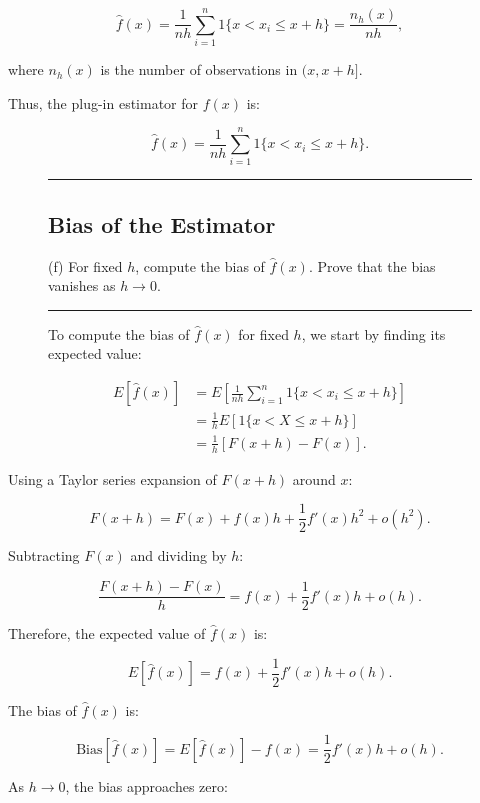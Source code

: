 \documentclass{article}
\newenvironment{colorparagraph}[1]{\par\color{#1}}{\par}
\begin{document}
\[
\hat{f}(x) = \frac{1}{n h} \sum_{i=1}^n 1\{ x < x_i \leq x + h \} = \frac{n_h(x)}{n h},
\]

where \( n_h(x) \) is the number of observations in \( (x, x + h] \).

Thus, the plug-in estimator for \( f(x) \) is:

\[
\hat{f}(x) = \frac{1}{n h} \sum_{i=1}^n 1\{ x < x_i \leq x + h \}.
\]

\begin{figure}[H]
\begin{colorparagraph}{questioncolor}
\label{q2f}
\rule{\textwidth}{0.5pt}
\subsection{Bias of the Estimator}
(f) For fixed \( h \), compute the bias of \( \hat{f}(x) \). Prove that the bias vanishes as \( h \to 0 \).

\rule{\textwidth}{0.5pt}
\end{colorparagraph}

To compute the bias of \( \hat{f}(x) \) for fixed \( h \), we start by finding its expected value:
\end{figure}

\[
\begin{aligned}
E[\hat{f}(x)] &= E\left[ \frac{1}{n h} \sum_{i=1}^n 1\{ x < x_i \leq x + h \} \right] \\
&= \frac{1}{h} E\left[ 1\{ x < X \leq x + h \} \right] \\
&= \frac{1}{h} \left[ F(x + h) - F(x) \right].
\end{aligned}
\]

Using a Taylor series expansion of \( F(x + h) \) around \( x \):

\[
F(x + h) = F(x) + f(x) h + \frac{1}{2} f'(x) h^2 + o(h^2).
\]

Subtracting \( F(x) \) and dividing by \( h \):

\[
\frac{F(x + h) - F(x)}{h} = f(x) + \frac{1}{2} f'(x) h + o(h).
\]

Therefore, the expected value of \( \hat{f}(x) \) is:

\[
E[\hat{f}(x)] = f(x) + \frac{1}{2} f'(x) h + o(h).
\]

The bias of \( \hat{f}(x) \) is:

\[
\text{Bias}[\hat{f}(x)] = E[\hat{f}(x)] - f(x) = \frac{1}{2} f'(x) h + o(h).
\]

As \( h \to 0 \), the bias approaches zero:
\end{document}
